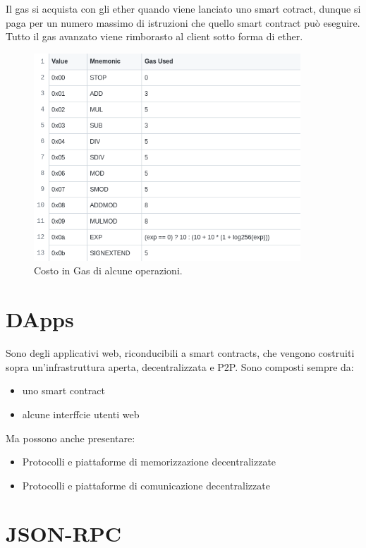 Il gas si acquista con gli ether quando viene lanciato uno smart cotract,
dunque si paga per un numero massimo di istruzioni che quello smart contract può eseguire.
Tutto il gas avanzato viene rimborasto al client sotto forma di ether.

\begin{figure}[H]
      \centering
      \includegraphics[width=10cm, keepaspectratio]{capitoli/ethereum/imgs/costo_gas.png}
      \caption{Costo in Gas di alcune operazioni.}
\end{figure}

\section{DApps}

Sono degli applicativi web, riconducibili a smart contracts, che vengono costruiti sopra
un'infrastruttura aperta, decentralizzata e P2P.
Sono composti sempre da:

\begin{itemize}
      \item uno smart contract
      \item alcune interffcie utenti web
\end{itemize}

Ma possono anche presentare:

\begin{itemize}
      \item Protocolli e piattaforme di memorizzazione decentralizzate
      \item Protocolli e piattaforme di comunicazione decentralizzate
\end{itemize}

\section{JSON-RPC}

